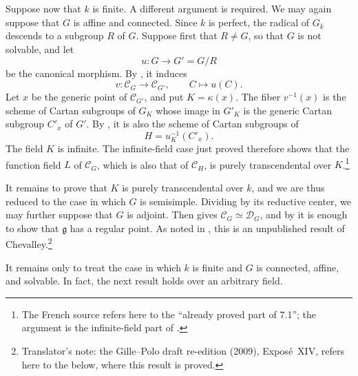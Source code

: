 Suppose now that \(k\) is finite. A different argument is
required. We may again suppose that \(G\) is affine and
connected. Since \(k\) is perfect, the radical of
\(G_{\bar k}\) descends to a subgroup \(R\) of \(G\).
Suppose first that \(R\ne G\), so that \(G\) is not solvable, and
let
\[
  u\colon G\longrightarrow G'=G/R
\]
be the canonical morphism. By \textup{}, it induces
\[
  v\colon\mathcal C_G\longrightarrow\mathcal C_{G'},
  \qquad C\longmapsto u(C).
\]
Let \(x\) be the generic point of \(\mathcal C_{G'}\), and put
\(K=\kappa(x)\). The fiber \(v^{-1}(x)\) is the scheme of Cartan
subgroups of \(G_K\) whose image in \(G'_K\) is the generic
Cartan subgroup \(C'_x\) of \(G'\). By \textup{}, it is
also the scheme of Cartan subgroups of
\[
  H=u_K^{-1}(C'_x).
\]
The field \(K\) is infinite. The infinite-field case just proved
therefore shows that the function field \(L\) of
\(\mathcal C_G\), which is also that of \(\mathcal C_H\), is
purely transcendental over \(K\).\footnote{The French source
refers here to the ``already proved part of 7.1''; the argument
is the infinite-field part of .}

It remains to prove that \(K\) is purely transcendental over
\(k\), and we are thus reduced to the case in which \(G\) is
semisimple. Dividing by its reductive center, we may further
suppose that \(G\) is adjoint. Then  gives
\(\mathcal C_G\simeq\mathcal D_G\), and by  it is enough to
show that \(\mathfrak g\) has a regular point. As noted in ,
this is an unpublished result of Chevalley.\footnote{Translator's note: the Gille--Polo draft re-edition (2009), Exposé~XIV, refers here to the  below, where this result is proved.}

It remains only to treat the case in which \(k\) is finite and
\(G\) is connected, affine, and solvable. In fact, the next
result holds over an arbitrary field.
